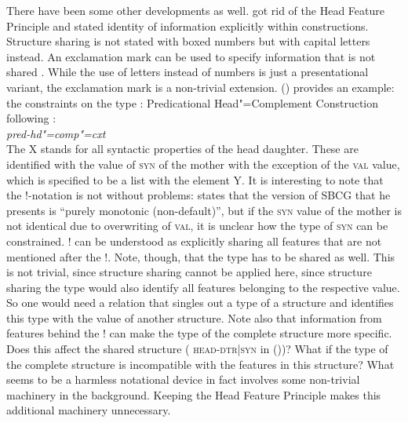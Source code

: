 \documentclass[output=paper,biblatex,babelshorthands,newtxmath,draftmode,colorlinks,citecolor=brown]{langscibook}
\begin{document}
There have been some other developments as well. \citet{Sag2012a} got rid of the Head Feature
Principle and stated identity of information explicitly within constructions. Structure sharing is
not stated with boxed numbers but with capital letters instead. An exclamation mark can be used to
specify information that is not shared \citep[]{Sag2012a}. While the use of letters instead
of numbers is just a presentational variant, the exclamation mark is a non-trivial
extension. () provides an example: the constraints on the type :
\eas
Predicational Head"=Complement Construction following \citet[]{Sag2012a}:\\
\emph{pred-hd"=comp"=cxt} \impl\\
\zs
The X stands for all syntactic properties of the head daughter. These are identified with the
value of \textsc{syn} of the mother with the exception of the \textsc{val} value, which is specified
to be a list with the element Y. It is interesting to note that the !-notation is not without
problems: \citet[]{Sag2012a} states that the version of SBCG that he presents is ``purely
monotonic (non-default)'', but if the \textsc{syn} value of the mother is not identical due to overwriting of \textsc{val}, it is unclear how the type of \textsc{syn} can be constrained. ! can be
understood as explicitly sharing all features that are not mentioned after the !. Note, though, that
the type has to be shared as well. This is not trivial, since structure sharing cannot be applied
here, since structure sharing the type would also identify all features belonging to the respective
value. So one would need a relation that singles out a type of a structure and identifies this type
with the value of another structure. Note also that information from features behind the ! can make
the type of the complete structure more specific. Does this affect the shared structure (\eg
\textsc{head-dtr|syn} in ())? What if the
type of the complete structure is incompatible with the features in this structure? What seems to be a harmless notational device in fact involves some
non-trivial machinery in the background. Keeping the Head Feature Principle makes this additional machinery
unnecessary.
\end{document}
